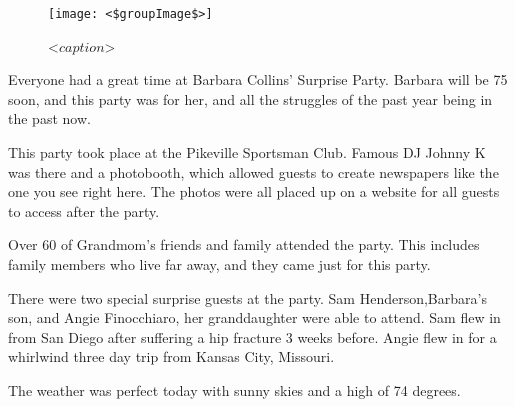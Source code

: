 \documentclass[letterpaper,11pt]{article}
\date{\today}
\begin{document}
\maketitle

\begin{figure}[h]
    \centering
    \texttt{[image: <\$groupImage\$>]}
    \caption{<$caption$>}
\end{figure}

\begin{multicols}{3}
    Everyone had a great time at Barbara Collins' Surprise Party. Barbara
    will be 75 soon, and this party
    was for her, and all the struggles of the past year being in the past
    now.
    
    This party
    took place at the Pikeville Sportsman Club. Famous DJ Johnny K was there and a
    photobooth, which allowed guests to create newspapers like the one you
    see right here. The photos were all placed up on a website for all
    guests to access after the party.

    Over 60
    of Grandmom's friends and family attended the party. This
    includes family members who live far away, and they came just for
    this party.

    \closearticle


    There were two special surprise guests at the party. Sam Henderson,Barbara's son,
    and Angie Finocchiaro, her granddaughter were able to attend. Sam flew in from San
    Diego after suffering a hip fracture 3 weeks before. Angie flew in for a whirlwind
    three day trip from Kansas City, Missouri.
    \closearticle

    The weather was perfect today with sunny skies and a high of 74 degrees.



    \closearticle

\end{multicols}
\end{document}
